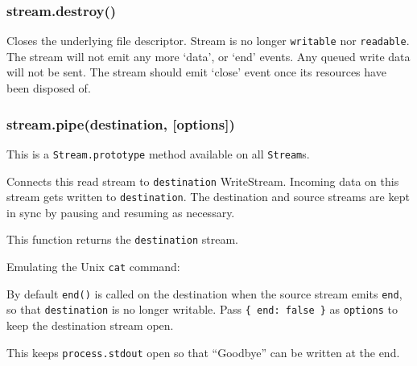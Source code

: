 \subsubsection{stream.destroy()}

Closes the underlying file descriptor. Stream is no longer
\texttt{writable} nor \texttt{readable}. The stream will not emit any
more `data', or `end' events. Any queued write data will not be sent.
The stream should emit `close' event once its resources have been
disposed of.

\subsubsection{stream.pipe(destination, {[}options{]})}

This is a \texttt{Stream.prototype} method available on all
\texttt{Stream}s.

Connects this read stream to \texttt{destination} WriteStream. Incoming
data on this stream gets written to \texttt{destination}. The
destination and source streams are kept in sync by pausing and resuming
as necessary.

This function returns the \texttt{destination} stream.

Emulating the Unix \texttt{cat} command:

\begin{Shaded}
\begin{Highlighting}[]
\NormalTok{(); }\NormalTok{(}\NormalTok{);}
\end{Highlighting}
\end{Shaded}

By default \texttt{end()} is called on the destination when the source
stream emits \texttt{end}, so that \texttt{destination} is no longer
writable. Pass \texttt{\{ end: false \}} as \texttt{options} to keep the
destination stream open.

This keeps \texttt{process.stdout} open so that ``Goodbye'' can be
written at the end.

\begin{Shaded}
\begin{Highlighting}[]
\NormalTok{();}

\NormalTok{(}\NormalTok{, \{ }\NormalTok{: } \NormalTok{\});}

\NormalTok{(}\NormalTok{, }\NormalTok{() \{}
\NormalTok{(}\NormalTok{); \});}
\end{Highlighting}
\end{Shaded}

